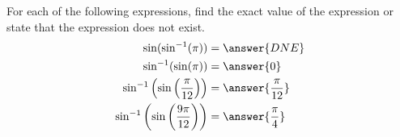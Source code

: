 \documentclass{ximera}
\author{Nela Lakos \and Kyle Parsons}
\begin{document}
\begin{exercise}

For each of the following expressions, find the exact value of the expression or state that the expression does not exist.
\begin{align*}
\sin(\sin^{-1}(\pi)) &= \answer{DNE}\\
\sin^{-1}(\sin(\pi)) &= \answer{0}\\
\sin^{-1}\left(\sin\left(\frac{\pi}{12}\right)\right) &= \answer{\frac{\pi}{12}}\\
\sin^{-1}\left(\sin\left(\frac{9\pi}{12}\right)\right) &= \answer{\frac{\pi}{4}}
\end{align*}

\end{exercise}
\end{document}
